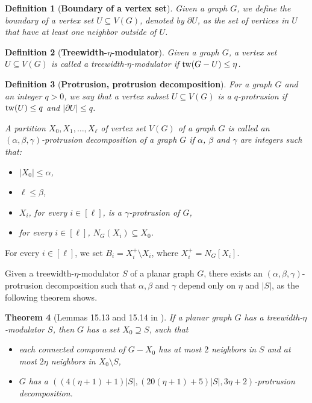 \documentclass{article}
\newcommand{\tw}{{\rm tw}}
\newtheorem{theorem}{Theorem}
\newtheorem{definition}[theorem]{Definition}
\numberwithin{claimcounter}{lemma}
\begin{document}
\begin{definition}[\textbf{Boundary of a vertex set}]
Given a graph $G$, we define the \emph{boundary} of a vertex set $U \subseteq V(G)$, denoted by $\partial U$, as the set of vertices in $U$ that have at least one neighbor outside of $U$.    
\end{definition}


\begin{definition}[\textbf{Treewidth-$\eta$-modulator}]
    Given a graph $G$, a vertex set $U \subseteq V(G)$ is called a treewidth-$\eta$-modulator if $\tw(G-U) \leq \eta$.
\end{definition}



\begin{definition}[\textbf{Protrusion, protrusion decomposition}]
For a graph $G$ and an integer $q>0$, we say that a vertex subset $U\subseteq V(G)$ is a \emph{$q$-protrusion} if $\tw(U) \leq q$ and $|\partial U| \leq q$.    

A partition $X_0,X_1,\dots,X_\ell$  of vertex set $V(G)$ of a graph $G$ is called an \emph{$(\alpha,\beta,\gamma)$-protrusion decomposition} of a graph $G$ if $\alpha$, $\beta$ and $\gamma$ are integers such that:

\begin{itemize}
    \item $|X_0| \leq \alpha$,
    \item $\ell \leq \beta$,
    \item $X_i$, for every $i \in [\ell]$, is a $\gamma$-protrusion of $G$,
    \item for every $i \in [\ell]$, $N_G(X_i) \subseteq X_0 $.
\end{itemize}
\end{definition}


For every $i \in [\ell]$, we set $B_i = X_i^+ \setminus X_i$, where $X_i^+ = N_G[X_i]$.


Given a treewidth-$\eta$-modulator $S$ of a planar graph $G$, there exists an $(\alpha,\beta,\gamma)$-protrusion decomposition such that $\alpha,\beta$ and $\gamma$ depend only on $\eta$ and $|S|$, as the following theorem shows.


\begin{theorem}[Lemmas 15.13 and 15.14 in \cite{kernelbook}]
\label{thm:protrusioncomp}
    If a planar graph $G$ has a treewidth-$\eta$-modulator $S$, then
$G$ has a set $X_0 \supseteq S$, such that 
\begin{itemize}
\item each connected component of $G-X_0$ has at most $2$ neighbors in $S$
and at most $2\eta$ neighbors in $X_0\setminus S$,
\item $G$ has a $\left(\left(4\left(\eta+1\right)+1\right)\left|S\right|,\left(20(\eta+1)+5\right)\left|S\right|,3\eta+2\right)$-protrusion
decomposition.
\end{itemize}
\end{theorem}
\end{document}
